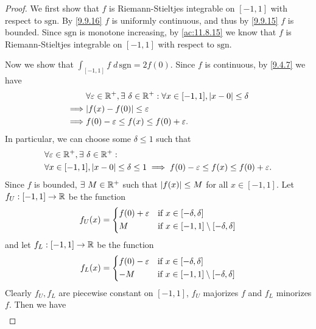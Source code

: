 \begin{proof}
  We first show that \(f\) is Riemann-Stieltjes integrable on \([-1, 1]\) with respect to \(\text{sgn}\).
  By \cref{9.9.16} \(f\) is uniformly continuous, and thus by \cref{9.9.15} \(f\) is bounded.
  Since \(\text{sgn}\) is monotone increasing, by \cref{ac:11.8.15} we know that \(f\) is Riemann-Stieltjes integrable on \([-1, 1]\) with respect to \(\text{sgn}\).

  Now we show that \(\int_{[-1, 1]} f \; d \, \text{sgn} = 2f(0)\).
  Since \(f\) is continuous, by \cref{9.4.7} we have
  \begin{align*}
             & \forall \varepsilon \in \R^+, \exists\ \delta \in \R^+ : \forall x \in [-1, 1], \abs{x - 0} \leq \delta \\
    \implies & \abs{f(x) - f(0)} \leq \varepsilon                                                                      \\
    \implies & f(0) - \varepsilon \leq f(x) \leq f(0) + \varepsilon.
  \end{align*}
  In particular, we can choose some \(\delta \leq 1\) such that
  \begin{align*}
     & \forall \varepsilon \in \mathbb{R}^+, \exists\ \delta \in \mathbb{R}^+ :                                                             \\
     & \forall x \in [-1, 1], \left\lvert x - 0\right\rvert \leq \delta \leq 1 \implies f(0) - \varepsilon \leq f(x) \leq f(0) + \varepsilon.
  \end{align*}
  Since \(f\) is bounded, \(\exists\ M \in \mathbb{R}^+\) such that \(\left\lvert f(x)\right\rvert \leq M\) for all \(x \in [-1, 1]\).
  Let \(f_U : [-1, 1] \to \mathbb{R}\) be the function
  \[
    f_U(x) = \begin{dcases}
      f(0) + \varepsilon & \text{if } x \in [-\delta, \delta]                   \\
      M                  & \text{if } x \in [-1, 1] \setminus [-\delta, \delta]
    \end{dcases}
  \]
  and let \(f_L : [-1, 1] \to \mathbb{R}\) be the function
  \[
    f_L(x) = \begin{dcases}
      f(0) - \varepsilon & \text{if } x \in [-\delta, \delta]                   \\
      -M                 & \text{if } x \in [-1, 1] \setminus [-\delta, \delta]
    \end{dcases}
  \]
  Clearly \(f_U, f_L\) are piecewise constant on \([-1, 1]\), \(f_U\) majorizes \(f\) and \(f_L\) minorizes \(f\).
  Then we have
  \begin{align*}

\end{align*}
\end{proof}
